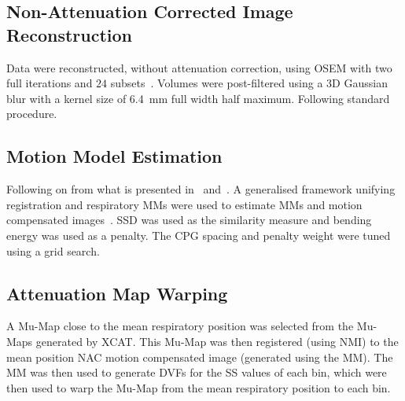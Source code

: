             \subsection{Non-Attenuation Corrected Image Reconstruction} \label{sec:pet_ct_respiratory_motion_correction_with_a_single_attenuation_map_using_nac_derived_deformation_fields_methods_non-attenuation_corrected_image_reconstruction}
                Data were reconstructed, without attenuation correction, using \gls{OSEM} with two full iterations and $24$ subsets~\parencite{Hudson1994}. Volumes were post-filtered using a \gls{3D} Gaussian blur with a kernel size of \SI{6.4}{\milli\metre} full width half maximum. Following standard procedure.
            
            \subsection{Motion Model Estimation} \label{sec:pet_ct_respiratory_motion_correction_with_a_single_attenuation_map_using_nac_derived_deformation_fields_methods_motion_model_estimation}
                Following on from what is presented in~ and~. A generalised framework unifying registration and respiratory \glspl{MM} were used to estimate \glspl{MM} and motion compensated images~\parencite{McClelland2017}. \gls{SSD} was used as the similarity measure and bending energy was used as a penalty. The \gls{CPG} spacing and penalty weight were tuned using a grid search.
            
            \subsection{Attenuation Map Warping} \label{sec:pet_ct_respiratory_motion_correction_with_a_single_attenuation_map_using_nac_derived_deformation_fields_methods_attenuation_map_warping}
                A \gls{Mu-Map} close to the mean respiratory position was selected from the \glspl{Mu-Map} generated by \gls{XCAT}. This \gls{Mu-Map} was then registered (using \gls{NMI}) to the mean position \gls{NAC} motion compensated image (generated using the \gls{MM}). The \gls{MM} was then used to generate \glspl{DVF} for the \gls{SS} values of each bin, which were then used to warp the \gls{Mu-Map} from the mean respiratory position to each bin.
            
